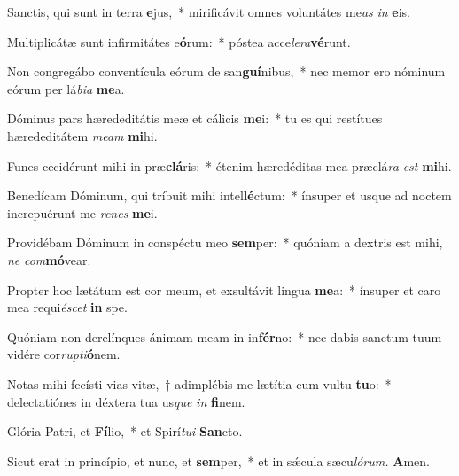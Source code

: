 \item Sanctis, qui sunt in terra \textbf{e}jus,~* mirificávit omnes voluntátes me\textit{as} \textit{in} \textbf{e}is.
\item Multiplicátæ sunt infirmitátes e\textbf{ó}rum:~* póstea acce\textit{lera}\textbf{vé}runt.
\item Non congregábo conventícula eórum de san\textbf{guí}nibus,~* nec memor ero nóminum eórum per lá\textit{bia} \textbf{me}a.
\item Dóminus pars hærededitátis meæ et cálicis \textbf{me}i:~* tu es qui restítues hærededitátem \textit{meam} \textbf{mi}hi.
\item Funes cecidérunt mihi in præ\textbf{clá}ris:~* étenim hæredéditas mea præclá\textit{ra} \textit{est} \textbf{mi}hi.
\item Benedícam Dóminum, qui tríbuit mihi intel\textbf{lé}ctum:~* ínsuper et usque ad noctem increpuérunt me \textit{renes} \textbf{me}i.
\item Providébam Dóminum in conspé\-ctu meo \textbf{sem}per:~* quóniam a dextris est mihi, \textit{ne} \textit{com}\textbf{mó}vear.
\item Propter hoc lætátum est cor meum, et exsultávit lingua \textbf{me}a:~* ínsuper et caro mea requi\textit{éscet} \textbf{in} spe.
\item Quóniam non derelínques ánimam meam in in\textbf{fér}no:~* nec dabis san\-ctum tuum vidére cor\textit{rupti}\textbf{ó}nem.
\item Notas mihi fecísti vias vitæ,~† adimplébis me lætítia cum vultu \textbf{tu}o:~* dele\-ctatiónes in déxtera tua us\textit{que} \textit{in} \textbf{fi}nem.
\item Glória Patri, et \textbf{Fí}lio,~* et Spirí\tinyhspace\textit{tui} \textbf{San}cto.
\item Sicut erat in princípio, et nunc, et \textbf{sem}per,~* et in sǽcula sæcu\tinyhspace\textit{lórum.} \textbf{A}men.

